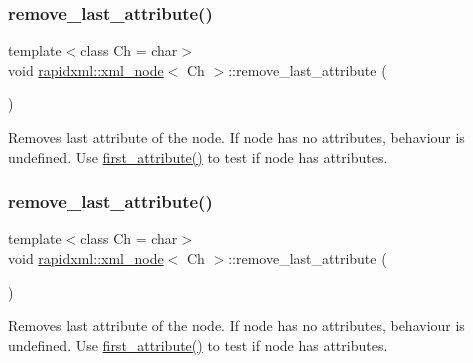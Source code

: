 \subsubsection{\texorpdfstring{remove\+\_\+last\+\_\+attribute()}{remove\_last\_attribute()}\hspace{0.1cm}{\footnotesize\ttfamily [1/2]}}
{\footnotesize\ttfamily template$<$class Ch = char$>$ \\
void \mbox{\hyperlink{classrapidxml_1_1xml__node}{rapidxml\+::xml\+\_\+node}}$<$ Ch $>$\+::remove\+\_\+last\+\_\+attribute (\begin{DoxyParamCaption}{ }\end{DoxyParamCaption})\hspace{0.3cm}{\ttfamily [inline]}}

Removes last attribute of the node. If node has no attributes, behaviour is undefined. Use \mbox{\hyperlink{classrapidxml_1_1xml__node_ab816ab6f13ee4b0588d5b76b0697511c}{first\+\_\+attribute()}} to test if node has attributes. \mbox{\label{classrapidxml_1_1xml__node_a1781a2cbedc9a51d609ad5b528125635}} 
\subsubsection{\texorpdfstring{remove\+\_\+last\+\_\+attribute()}{remove\_last\_attribute()}\hspace{0.1cm}{\footnotesize\ttfamily [2/2]}}
{\footnotesize\ttfamily template$<$class Ch = char$>$ \\
void \mbox{\hyperlink{classrapidxml_1_1xml__node}{rapidxml\+::xml\+\_\+node}}$<$ Ch $>$\+::remove\+\_\+last\+\_\+attribute (\begin{DoxyParamCaption}{ }\end{DoxyParamCaption})\hspace{0.3cm}{\ttfamily [inline]}}

Removes last attribute of the node. If node has no attributes, behaviour is undefined. Use \mbox{\hyperlink{classrapidxml_1_1xml__node_ab816ab6f13ee4b0588d5b76b0697511c}{first\+\_\+attribute()}} to test if node has attributes. \mbox{\label{classrapidxml_1_1xml__node_a9182512e948ec451a83f116cce7c7674}} 
